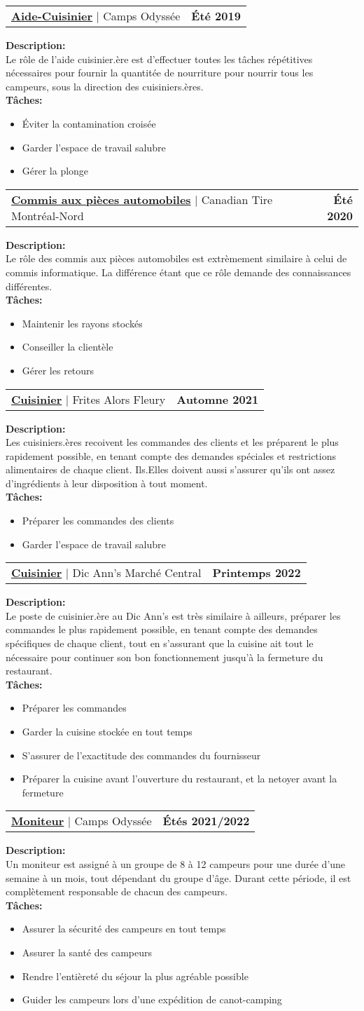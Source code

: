 \documentclass{article}
\makeatletter
\newcommand{\resumeItem}[1]{
  \item\small{
    {#1 \vspace{-2pt}}
  }
}
\newcommand{\formerJobHeading}[3]{
    \item
    \begin{tabular*}{1.001\textwidth}{l@{\extracolsep{\fill}}r}
      \textbf{\underline{\large#1}} $|$ \large#2 & \textbf{\small #3}\\
    \end{tabular*}\vspace{3pt}
    }
\newcommand{\jobDescription}[1]{\textbf{\large Description:}\\{\small#1}\\}
\newcommand{\jobTaskListStart}{\textbf{\large Tâches:}\begin{itemize}}
\newcommand{\jobTaskListEnd}{\end{itemize}\vspace{-18pt}}
\makeatother
\begin{document}
\formerJobHeading{Aide-Cuisinier}{Camps Odyssée}{Été 2019}
\jobDescription{Le rôle de l'aide cuisinier.ère est d'effectuer toutes les tâches répétitives
  nécessaires pour fournir la quantitée de nourriture pour nourrir tous les campeurs,
  sous la direction des cuisiniers.ères.}
\jobTaskListStart
\resumeItem{Éviter la contamination croisée}
\resumeItem{Garder l'espace de travail salubre}
\resumeItem{Gérer la plonge}
\jobTaskListEnd

\formerJobHeading{Commis aux pièces automobiles}{Canadian Tire Montréal-Nord}{Été 2020}
\jobDescription{Le rôle des commis aux pièces automobiles est extrèmement similaire à celui de commis informatique.
  La différence étant que ce rôle demande des connaissances différentes.}
\jobTaskListStart
\resumeItem{Maintenir les rayons stockés}
\resumeItem{Conseiller la clientèle}
\resumeItem{Gérer les retours}
\jobTaskListEnd

\formerJobHeading{Cuisinier}{Frites Alors Fleury}{Automne 2021}
\jobDescription{Les cuisiniers.ères recoivent les commandes des clients et les préparent le plus
  rapidement possible, en tenant compte des demandes spéciales et restrictions alimentaires
  de chaque client. Ils.Elles doivent aussi s'assurer qu'ils ont assez d'ingrédients à leur disposition
  à tout moment.}
\jobTaskListStart
\resumeItem{Préparer les commandes des clients}
\resumeItem{Garder l'espace de travail salubre}
\jobTaskListEnd

\formerJobHeading{Cuisinier}{Dic Ann's Marché Central}{Printemps 2022}
\jobDescription{Le poste de cuisinier.ère au Dic Ann's est très similaire à ailleurs, préparer les commandes
le plus rapidement possible, en tenant compte des demandes spécifiques de chaque client, tout en s'assurant
que la cuisine ait tout le nécessaire pour continuer son bon fonctionnement jusqu'à la fermeture du restaurant.}
\jobTaskListStart
\resumeItem{Préparer les commandes}
\resumeItem{Garder la cuisine stockée en tout temps}
\resumeItem{S'assurer de l'exactitude des commandes du fournisseur}
\resumeItem{Préparer la cuisine avant l'ouverture du restaurant, et la netoyer avant la fermeture}
\jobTaskListEnd

\formerJobHeading{Moniteur}{Camps Odyssée}{Étés 2021/2022}
\jobDescription{Un moniteur est assigné à un groupe de 8 à 12 campeurs pour une durée d'une semaine à un mois, tout dépendant du groupe d'âge.
Durant cette période, il est complètement responsable de chacun des campeurs.}
\jobTaskListStart
\resumeItem{Assurer la sécurité des campeurs en tout temps}
\resumeItem{Assurer la santé des campeurs}
\resumeItem{Rendre l'entièreté du séjour la plus agréable possible}
\resumeItem{Guider les campeurs lors d'une expédition de canot-camping}
\jobTaskListEnd
\end{document}
